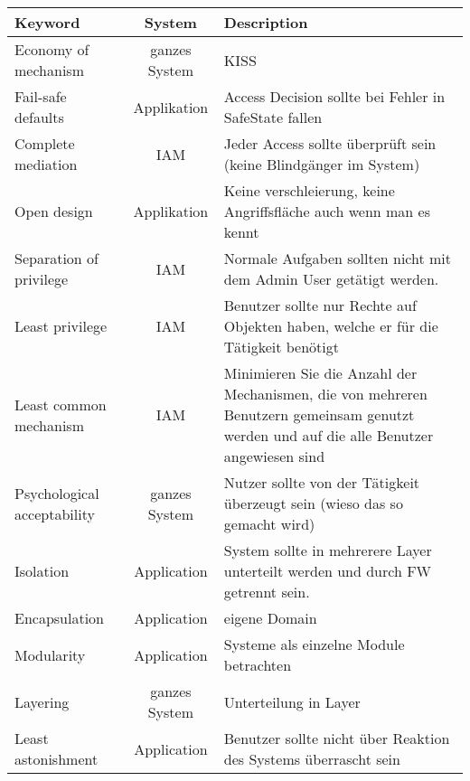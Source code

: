 \begin{center}
    \begin{tabular}{l c p{8cm}}
        \hline
        Keyword                        &    System              & Description\\
        \hline\hline
        Economy of mechanism           &   ganzes System        &   KISS\\\hline
        Fail-safe defaults             &   Applikation          &   Access Decision sollte bei Fehler in Safe\-State fallen\\\hline
        Complete mediation             &   IAM                  &   Jeder Access sollte überprüft sein (keine Blindgänger im System)\\\hline
        Open design                    &   Applikation          &   Keine verschleierung, keine Angriffsfläche auch wenn man es kennt\\\hline
        Separation of privilege        &   IAM                  &   Normale Aufgaben sollten nicht mit dem Admin User getätigt werden.\\\hline
        Least privilege                &   IAM                  &   Benutzer sollte nur Rechte auf Objekten haben, welche er für die Tätigkeit benötigt\\\hline
        Least common mechanism         &   IAM                  &   Minimieren Sie die Anzahl der Mechanismen, die von mehreren Benutzern gemeinsam genutzt werden und auf die alle Benutzer angewiesen sind\\\hline
        Psychological acceptability    &   ganzes System        &   Nutzer sollte von der Tätigkeit überzeugt sein (wieso das so gemacht wird)\\\hline
        Isolation                      &   Application          &   System sollte in mehrerere Layer unterteilt werden und durch FW getrennt sein.\\\hline
        Encapsulation                  &   Application          &   eigene Domain\\\hline
        Modularity                     &   Application          &   Systeme als einzelne Module betrachten\\\hline
        Layering                       &   ganzes System        &   Unterteilung in Layer \textit{\nameref{subsubsec:implementation-of-access-controls}}\\\hline
        Least astonishment             &   Application          &   Benutzer sollte nicht über Reaktion des Systems überrascht sein\\\hline
    \end{tabular}
\end{center}




